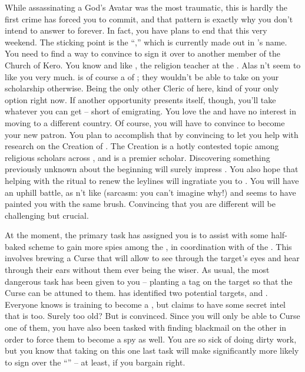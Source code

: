 \documentclass[char]{GL2020}
\begin{document}
While assassinating a God's Avatar was the most traumatic, this is hardly the first crime \cAntiChup{} has forced you to commit, and that pattern is exactly why you don't intend to answer to \cAntiChup{} forever. In fact, you have plans to end that this very weekend. The sticking point is the ``\iScholarship{},'' which is currently made out in \cAntiChup{}'s name. You need to find a way to convince \cAntiChup{} to sign it over to another member of the Church of Kero. You know and like \cBeetle{\full}, the religion teacher at the \pSc{}. Alas \cBeetle{\they} \cBeetle{\does}n't seem to like you very much. \cBeetle{} is of course a \cBeetle{\cleric} of \cTechGod{}; they wouldn't be able to take on your scholarship otherwise. Being the only other Cleric of \cTechGod{} here, \cBeetle{\theyare} kind of your only option right now. If another opportunity presents itself, though, you'll take whatever you can get – short of emigrating. You love the \pTech{} and have no interest in moving to a different country. Of course, you will have to convince \cBeetle{} to become your new patron. You plan to accomplish that by convincing \cEbbPriest{\full} to let you help with \cEbbPriest{\their} research on the Creation of \pEarth{}. The Creation is a hotly contested topic among religious scholars across \pEarth{}, and \cBeetle{} is a premier scholar. Discovering something previously unknown about the beginning will surely impress \cBeetle{\them}. You also hope that helping with the ritual to renew the leylines will ingratiate you to \cBeetle{}. You will have an uphill battle, as \cBeetle{\they} \cBeetle{\does}n't like \cAntiChup{} (sarcasm: you can't imagine why!) and seems to have painted you with the same brush. Convincing \cBeetle{\them} that you are different will be challenging but crucial.

At the moment, the primary task \cAntiChup{} has assigned you is to assist with some half-baked scheme to gain more spies among the \pShip{}, in coordination with \cPrince{\full} of the \pFarm{}. This involves brewing a Curse that will allow \cAntiChup{} to see through the target's eyes and hear through their ears without them ever being the wiser. As usual, the most dangerous task has been given to you – planting a tag on the target so that the Curse can be attuned to them. \cAntiChup{} has identified two potential targets, \cInitiate{\full} and \cPirate{\full}. Everyone knows \cInitiate{} is training to become a \cInitiate{\cleric}, but \cAntiChup{} claims to have some secret intel that \cPirate{} is too. Surely \cPirate{\theyare} too old? But \cAntiChup{} is convinced. Since you will only be able to Curse one of them, you have also been tasked with finding blackmail on the other in order to force them to become a spy as well. You are so sick of doing \cAntiChup{} dirty work, but you know that taking on this one last task will make \cAntiChup{} significantly more likely to sign over the ``\iScholarship{}'' -- at least, if you bargain right.
\end{document}
